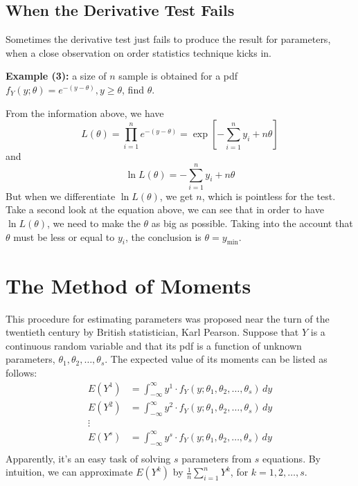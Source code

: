 \documentclass[11pt]{article}
\begin{document}
\subsection{\small When the Derivative Test Fails}
Sometimes the derivative test just fails to produce the result for parameters,  when a close observation on order statistics technique kicks in.  

\textbf{Example (3):} a size of $n$ sample is obtained for a pdf $f_Y (y; \theta) = e ^{-(y-\theta)},  y\geqslant \theta$,  find $\theta$.

From the information above,  we have
\[
L(\theta) = \prod _{i=1} ^n e^{-(y-\theta)} = \exp \left[ - \sum _{i=1} ^n y_i + n\theta \right]
\]
and
\[
\ln L(\theta) = - \sum _{i=1} ^n y_i + n\theta
\]
But when we differentiate $\ln L(\theta)$,  we get $n$, which is pointless for the test.  Take a second look at the equation above,  we can see that in order to have $\ln L(\theta)$,  we need to make the $\theta$ as big as possible.  Taking into the account that $\theta$ must be less or equal to $y_i$,  the conclusion is $\theta = y_{\min}$.



\section{\normalsize The Method of Moments}

This procedure for estimating parameters was proposed near the turn of the twentieth century by British statistician,  Karl Pearson.  Suppose that $Y$ is a continuous random variable and that its pdf is a function of unknown parameters, $\theta_1, \theta_2, \dots, \theta_s$.  The expected value of its moments can be listed as follows:
\[
\begin{aligned}
E(Y^1) &= \int _{-\infty} ^\infty y^1 \cdot f_Y(y; \theta_1, \theta_2, \dots, \theta_s) \, dy \\
E(Y^2) &= \int _{-\infty} ^\infty y^2 \cdot f_Y(y; \theta_1, \theta_2, \dots, \theta_s) \, dy \\
\vdots \\
E(Y^s) &= \int _{-\infty} ^\infty y^s \cdot f_Y(y; \theta_1, \theta_2, \dots, \theta_s) \, dy \\
\end{aligned}
\]
Apparently,  it's an easy task of solving $s$ parameters from $s$ equations.  By intuition,  we can approximate $E(Y^k)$ by $\displaystyle \frac{1}{n} \sum _{i=1} ^n Y^k$,  for $k=1, 2,\dots, s$. 
\end{document}
